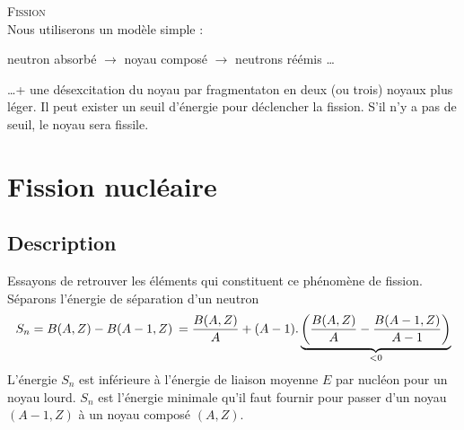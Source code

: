 \textsc{Fission}\\
Nous utiliserons un modèle simple :
\begin{center}
neutron absorbé $\longrightarrow$ noyau composé $\longrightarrow$ neutrons réémis \dots
\end{center}
\dots + une désexcitation du noyau par fragmentaton en deux (ou trois) noyaux plus léger. Il 
peut exister un seuil d'énergie pour déclencher la fission. S'il n'y a pas de seuil, le noyau
sera fissile.




\newpage
\section{Fission nucléaire}
\subsection{Description}
Essayons de retrouver les éléments qui constituent ce phénomène de fission. Séparons l'énergie de 
séparation d'un neutron
\begin{equation}
{S_n} = B(A,Z) - B(A - 1,Z)  {\kern 1pt} {\kern 1pt}  = \frac{{B(A,Z)}}{A} + (A - 1).
\underbrace{\left( {\frac{{B(A,Z)}}{A} - \frac{{B(A - 1,Z)}}{{A - 1}}} \right)}_{<0}
\end{equation}
L'énergie $S_n$ est inférieure à l'énergie de liaison moyenne $E$ par nucléon pour un noyau lourd.
$S_n$ est l'énergie minimale qu'il faut fournir pour passer d'un noyau $(A-1,Z)$ à un noyau composé $(A,Z)$.


